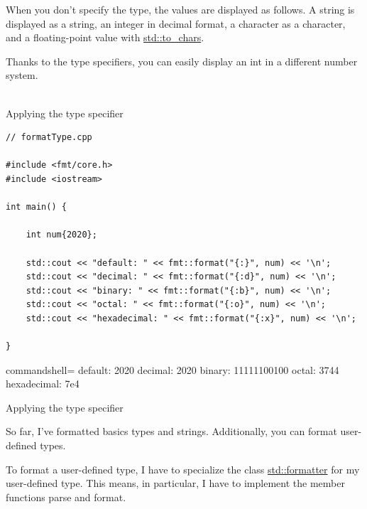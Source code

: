 When you don’t specify the type, the values are displayed as follows. A string is displayed as a string, an integer in decimal format, a character as a character, and a floating-point value with \href{https://en.cppreference.com/w/cpp/utility/to_chars}{std::to\_chars}.

Thanks to the type specifiers, you can easily display an int in a different number system.

\hspace*{\fill} \\ %
\noindent
Applying the type specifier
\begin{lstlisting}[style=styleCXX]
// formatType.cpp

#include <fmt/core.h>
#include <iostream>

int main() {

	int num{2020};
	
	std::cout << "default: " << fmt::format("{:}", num) << '\n';
	std::cout << "decimal: " << fmt::format("{:d}", num) << '\n';
	std::cout << "binary: " << fmt::format("{:b}", num) << '\n';
	std::cout << "octal: " << fmt::format("{:o}", num) << '\n';
	std::cout << "hexadecimal: " << fmt::format("{:x}", num) << '\n';

}
\end{lstlisting}

\begin{tcblisting}{commandshell={}}
default:     2020
decimal:     2020
binary:      11111100100
octal:       3744
hexadecimal: 7e4
\end{tcblisting}

\begin{center}
Applying the type specifier
\end{center}

So far, I’ve formatted basics types and strings. Additionally, you can format user-defined types.


To format a user-defined type, I have to specialize the class \href{https://en.cppreference.com/w/cpp/utility/format/formatter}{std::formatter} for my user-defined type. This means, in particular, I have to implement the member functions parse and format.

